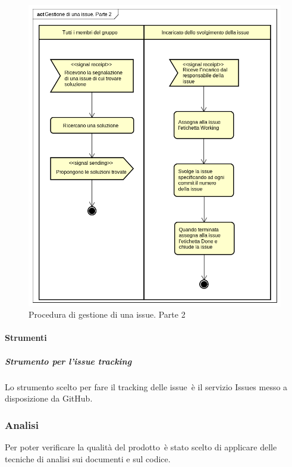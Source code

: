\documentclass[../NormeProgetto.tex]{subfiles}
\begin{document}
				\begin{figure}[H]
					\centering
					\includegraphics[scale= 0.75, width=\textwidth]{sections/img/gestioneIssueP2.png}
					\caption{Procedura di gestione di una issue. Parte 2}\label{fig:Procedura di gestione di una issue parte 2} 
				\end{figure}

		
\newpage
	\paragraph{Strumenti} \label{sec:Strumenti}
			\subparagraph{Strumento per l'issue tracking} \label{par:IssueTrk GitHub}
				Lo strumento scelto per fare il tracking delle issue\g\ è il servizio Issues messo a disposizione da GitHub\g. 

	\subsubsection{Analisi}
				Per poter verificare la qualità del prodotto\g\ è stato scelto di applicare delle tecniche di analisi sui documenti e sul codice. 
\end{document}
